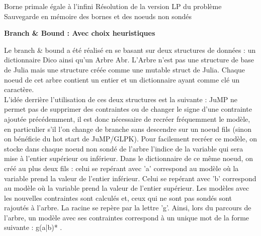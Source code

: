 \documentclass[a4paper,10pt]{article}
\begin{document}
\begin{algorithm}[!h]
  \begin{small}
    \BlankLine\DontPrintSemicolon
    Borne primale égale à l'infini\;
    Résolution de la version LP du problème\;
    Sauvegarde en mémoire des bornes et des noeuds non sondés\;
  \end{small}
  \caption{\textbf{Branch \& Bound : Avec choix heuristiques}}
\end{algorithm}


Le branch \& bound a été réalisé en se basant sur deux structures de données : un dictionnaire Dico ainsi qu'un Arbre Abr. L'Arbre n'est pas une structure de base de Julia mais une structure créée comme une mutable struct de Julia. Chaque noeud de cet arbre contient un entier et un dictionnaire ayant comme clé un caractère. \\

L'idée derrière l'utilisation de ces deux structures est la suivante : JuMP ne permet pas de supprimer des contraintes ou de changer le signe d'une contrainte ajoutée précédemment, il est donc nécessaire de recréer fréquemment le modèle, en particulier s'il l'on change de branche sans descendre sur un noeud fils (sinon on bénéficie du hot start de JuMP/GLPK). Pour facilement recréer ce modèle, on stocke dans chaque noeud non sondé de l'arbre l'indice de la variable qui sera mise à l'entier supérieur ou inférieur. Dans le dictionnaire de ce même noeud, on créé au plus deux fils : celui se repérant avec 'a' correspond au modèle où la variable prend la valeur de l'entier inférieur. Celui se repérant avec 'b' correspond au modèle où la variable prend la valeur de l'entier supérieur. Les modèles avec les nouvelles contraintes sont calculés et, ceux qui ne sont pas sondés sont rajoutés à l'arbre. La racine se repère par la lettre 'g'. Ainsi, lors du parcours de l'arbre, un modèle avec ses contraintes correspond à un unique mot de la forme suivante : g(a|b)* . \\
\end{document}
